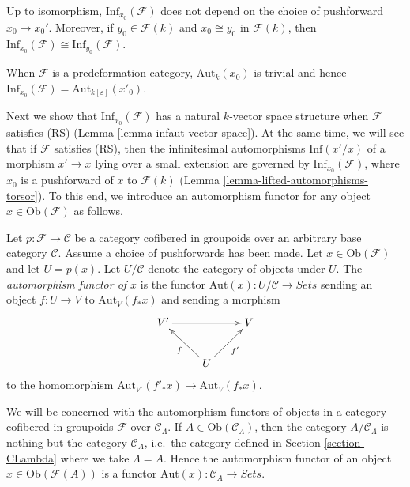 \begin{remark}
\label{remark-choice-pushforward-immaterial-infinitesimal-aut}
Up to isomorphism, $\text{Inf}_{x_0}(\mathcal{F})$ does not depend on the 
choice of pushforward $x_0 \to x_0'$.  Moreover, if $y_0 \in \mathcal 
F(k)$ and $x_0 \cong y_0$ in $\mathcal{F}(k)$, then 
$\text{Inf}_{x_0}(\mathcal{F}) \cong \text{Inf}_{y_0}(\mathcal{F})$.
\end{remark}

\begin{remark}
\label{remark-trivial-aut-point}
When $\mathcal{F}$ is a predeformation category, $\text{Aut}_{k}(x_0)$ is 
trivial and hence $\text{Inf}_{x_0}(\mathcal{F}) = 
\text{Aut}_{k[\varepsilon]}(x'_0)$.
\end{remark}

\noindent
Next we show that $\text{Inf}_{x_0}(\mathcal{F})$ has a natural $k$-vector 
space structure when $\mathcal{F}$ satisfies (RS) (Lemma 
\ref{lemma-infaut-vector-space}).  At the same time, we will see that if 
$\mathcal{F}$ satisfies (RS), then the infinitesimal automorphisms 
$\text{Inf}(x'/x)$ of a morphism $x' \to x$ lying over a small 
extension are governed by $\text{Inf}_{x_0}(\mathcal{F})$, where $x_0$ is 
a pushforward of $x$ to $\mathcal{F}(k)$ (Lemma 
\ref{lemma-lifted-automorphisms-torsor}).  To this end, we introduce an 
automorphism functor for any object $x \in \text{Ob}(\mathcal{F})$ as 
follows.

\begin{definition}
\label{definition-automorphism-functor}
Let $p: \mathcal{F} \to \mathcal{C}$ be a category cofibered in groupoids 
over an arbitrary base category $\mathcal{C}$. Assume a choice of pushforwards 
has been made.  Let $x \in \text{Ob}(\mathcal{F})$ and let $U = p(x)$.  
Let $U/\mathcal{C}$ denote the category of objects under $U$. The 
{\it automorphism functor of $x$} is the functor $\text{Aut}(x): 
U/\mathcal{C} \to \textit{Sets}$ sending an object $f: U 
\to V$ to $\text{Aut}_{V}(f_*x)$ and sending a morphism
\[
\xymatrix{
V' \ar[rr] &                    & V\\
          & U \ar[ul]^{f}  \ar[ur]_{f'} & 
}
\]
to the homomorphism $\text{Aut}_{V'}(f'_*x) \to 
\text{Aut}_{V}(f_*x)$.
\end{definition}

\noindent 
We will be concerned with the automorphism functors of objects in a category 
cofibered in groupoids $\mathcal{F}$ over $\mathcal{C}_\Lambda$.  If $A \in 
\text{Ob}(\mathcal{C}_\Lambda)$, then the category $A/\mathcal{C}_\Lambda$ is 
nothing but the category $\mathcal{C}_{A}$, i.e.\ the category defined in 
Section \ref{section-CLambda}
where we take $\Lambda = A$.  Hence the 
automorphism functor of an object $x \in \text{Ob}(\mathcal{F}(A))$ is a functor 
$\text{Aut}(x): \mathcal{C}_{A} \to \textit{Sets}$.

